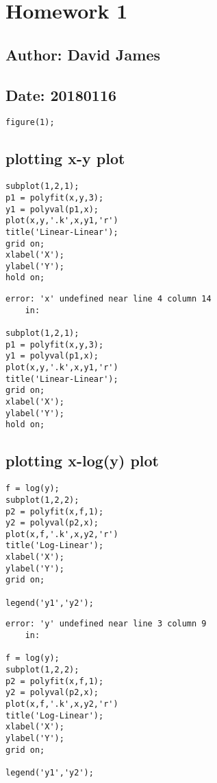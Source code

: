 \documentclass[10pt]{article}
\begin{document}
{\Huge\section*{Homework 1}}

\tableofcontents
\vspace*{4em}



{}
\subsection*{Author: David James}



{}
\subsection*{Date: 20180116}

\begin{lstlisting}
figure(1);
\end{lstlisting}


{}
\subsection*{plotting x-y plot}

\begin{lstlisting}
subplot(1,2,1);
p1 = polyfit(x,y,3);
y1 = polyval(p1,x);
plot(x,y,'.k',x,y1,'r')
title('Linear-Linear');
grid on;
xlabel('X');
ylabel('Y');
hold on;
\end{lstlisting}
\begin{lstlisting}[language={},xleftmargin=5pt,frame=none]
error: 'x' undefined near line 4 column 14
	in:

subplot(1,2,1);
p1 = polyfit(x,y,3);
y1 = polyval(p1,x);
plot(x,y,'.k',x,y1,'r')
title('Linear-Linear');
grid on;
xlabel('X');
ylabel('Y');
hold on;

\end{lstlisting}


{}
\subsection*{plotting x-log(y) plot}

\begin{lstlisting}
f = log(y);
subplot(1,2,2);
p2 = polyfit(x,f,1);
y2 = polyval(p2,x);
plot(x,f,'.k',x,y2,'r')
title('Log-Linear');
xlabel('X');
ylabel('Y');
grid on;

legend('y1','y2');
\end{lstlisting}
\begin{lstlisting}[language={},xleftmargin=5pt,frame=none]
error: 'y' undefined near line 3 column 9
	in:

f = log(y);
subplot(1,2,2);
p2 = polyfit(x,f,1);
y2 = polyval(p2,x);
plot(x,f,'.k',x,y2,'r')
title('Log-Linear');
xlabel('X');
ylabel('Y');
grid on;

legend('y1','y2');
\end{lstlisting}
\end{document}
